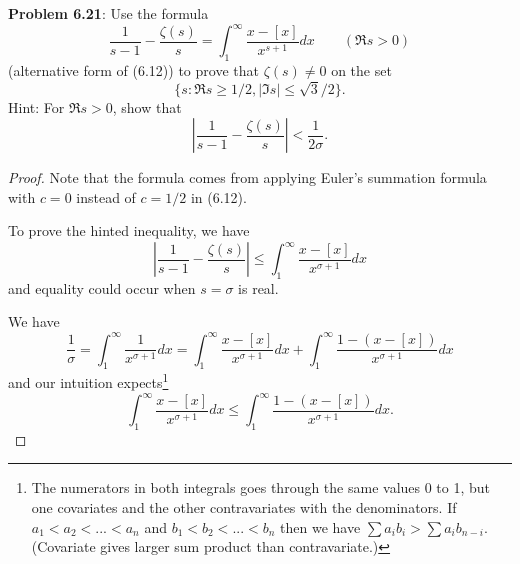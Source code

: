 \documentclass[12pt]{article}
\newcommand{\Abs}[1]{\left| #1 \right|}
\begin{document}
\fi

\textbf{Problem 6.21}: Use the formula
$$\frac{1}{s - 1} - \frac{\zeta(s)}{s} = \int_1^\infty \frac{x - [x]}{x^{s+1}} dx \qquad (\Re s > 0)$$
(alternative form of (6.12)) to prove that $\zeta(s) \not= 0$ on the set
$$\{s : \Re s \geq 1/2, |\Im s| \leq \sqrt 3 / 2\}.$$
Hint: For $\Re s > 0$, show that
$$\Abs{ \frac{1}{s - 1} - \frac{\zeta(s)}{s} } < \frac{1}{2\sigma}.$$

\begin{proof}
Note that the formula comes from applying Euler's summation formula with $c = 0$ instead of $c = 1/2$ in (6.12).

To prove the hinted inequality, we have
$$\Abs{ \frac{1}{s - 1} - \frac{\zeta(s)}{s} } \leq \int_1^\infty \frac{x - [x]}{x^{\sigma + 1}} dx$$
and equality could occur when $s = \sigma$ is real.

We have
$$\frac{1}{\sigma} = \int_1^\infty \frac{1}{x^{\sigma + 1}} dx = \int_1^\infty \frac{x - [x]}{x^{\sigma + 1}} dx + \int_1^\infty \frac{1 - (x - [x])}{x^{\sigma + 1}} dx$$
and our intuition expects\footnote{The numerators in both integrals goes through the same values 0 to 1, but one covariates and the other contravariates with the denominators. If $a_1 < a_2 < ... < a_n$ and $b_1 < b_2 < ... < b_n$ then we have $\sum a_i b_i > \sum a_i b_{n-i}$. (Covariate gives larger sum product than contravariate.)}
$$\int_1^\infty \frac{x - [x]}{x^{\sigma + 1}} dx \leq \int_1^\infty \frac{1 - (x - [x])}{x^{\sigma + 1}} dx.$$


\end{proof}
\end{document}
